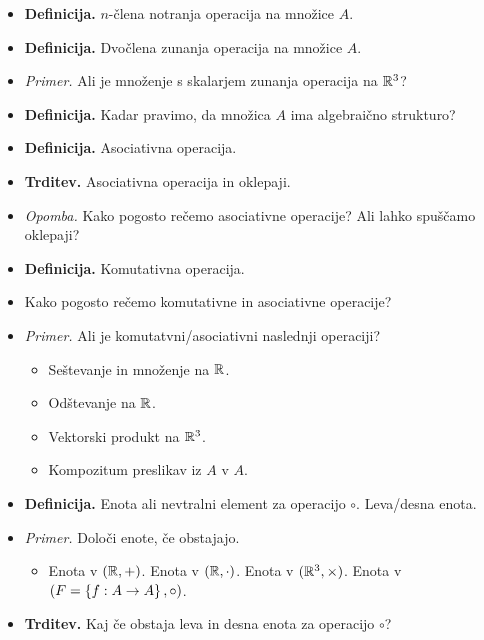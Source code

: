 \begin{enumerate}
\begin{itemize}
\begin{itemize}
        \end{itemize}
        \item \colorbox{purple!30}{\textbf{Definicija.}} $n$-člena notranja operacija na množice $A$. 
        \item \colorbox{purple!30}{\textbf{Definicija.}} Dvočlena zunanja operacija na množice $A$. 
        \item \colorbox{yellow!30}{\emph{Primer.}} Ali je množenje s skalarjem zunanja operacija na $\mathbb{R}^3$?
        \item \colorbox{purple!30}{\textbf{Definicija.}} Kadar pravimo, da množica $A$ ima algebraično strukturo?
        \item \colorbox{purple!30}{\textbf{Definicija.}} Asociativna operacija.
        \item \colorbox{blue!30}{\textbf{Trditev.}} Asociativna operacija in oklepaji.
        \item \colorbox{yellow!30}{\emph{Opomba.}} Kako pogosto rečemo asociativne operacije? Ali lahko spuščamo oklepaji?
        \item \colorbox{purple!30}{\textbf{Definicija.}} Komutativna operacija.
        \item Kako pogosto rečemo komutativne in asociativne operacije?
        \item \colorbox{yellow!30}{\emph{Primer.}} Ali je komutatvni/asociativni naslednji operaciji?
        \begin{itemize}
            \item Seštevanje in množenje na $\mathbb{R}$.
            \item Odštevanje na $\mathbb{R}$.            
            \item Vektorski produkt na $\mathbb{R}^3$.            
            \item Kompozitum preslikav iz $A$ v $A$.
        \end{itemize}
        \item \colorbox{purple!30}{\textbf{Definicija.}} Enota ali nevtralni element za operacijo $\circ$. Leva/desna enota.
        \item \colorbox{yellow!30}{\emph{Primer.}} Določi enote, če obstajajo.
        \begin{itemize}
            \item Enota v $(\mathbb{R}, +)$.
            Enota v $(\mathbb{R}, \cdot)$.
            Enota v $(\mathbb{R}^3, \times)$.
            Enota v $(F = \left\{f: A \to A\right\}, \circ)$.
        \end{itemize}
        \item \colorbox{blue!30}{\textbf{Trditev.}} Kaj če obstaja leva in desna enota za operacijo $\circ$?

\end{itemize}
\end{enumerate}
